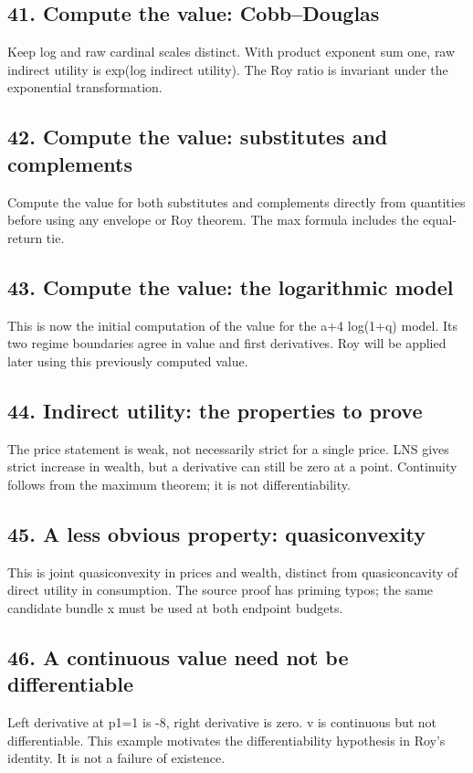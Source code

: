 \documentclass[11pt,a4paper]{article}
\begin{document}
\subsection*{41. Compute the value: Cobb--Douglas}
Keep log and raw cardinal scales distinct. With product exponent sum one, raw indirect utility is exp(log indirect utility). The Roy ratio is invariant under the exponential transformation.

\subsection*{42. Compute the value: substitutes and complements}
Compute the value for both substitutes and complements directly from quantities before using any envelope or Roy theorem. The max formula includes the equal-return tie.

\subsection*{43. Compute the value: the logarithmic model}
This is now the initial computation of the value for the a+4 log(1+q) model. Its two regime boundaries agree in value and first derivatives. Roy will be applied later using this previously computed value.

\subsection*{44. Indirect utility: the properties to prove}
The price statement is weak, not necessarily strict for a single price. LNS gives strict increase in wealth, but a derivative can still be zero at a point. Continuity follows from the maximum theorem; it is not differentiability.

\subsection*{45. A less obvious property: quasiconvexity}
This is joint quasiconvexity in prices and wealth, distinct from quasiconcavity of direct utility in consumption. The source proof has priming typos; the same candidate bundle x must be used at both endpoint budgets.

\subsection*{46. A continuous value need not be differentiable}
Left derivative at p1=1 is -8, right derivative is zero. v is continuous but not differentiable. This example motivates the differentiability hypothesis in Roy's identity. It is not a failure of existence.
\end{document}
